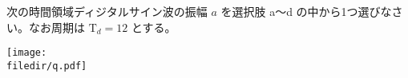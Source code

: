 次の時間領域ディジタルサイン波の振幅 $a$ を選択肢 a〜d の中から1つ選びなさい。なお周期は $\textrm{T}_d = 12$ とする。

\centering\texttt{[image: \\filedir/q.pdf]}
